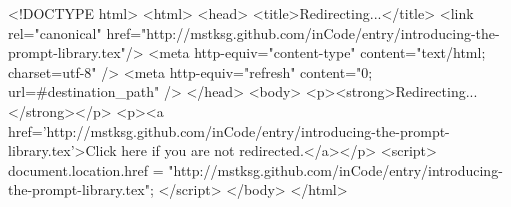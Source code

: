 <!DOCTYPE html>
<html>
<head>
<title>Redirecting...</title>
<link rel="canonical" href="http://mstksg.github.com/inCode/entry/introducing-the-prompt-library.tex"/>
<meta http-equiv="content-type" content="text/html; charset=utf-8" />
<meta http-equiv="refresh" content="0; url=#{destination_path}" />
</head>
<body>
  <p><strong>Redirecting...</strong></p>
  <p><a href='http://mstksg.github.com/inCode/entry/introducing-the-prompt-library.tex'>Click here if you are not redirected.</a></p>
  <script>
    document.location.href = "http://mstksg.github.com/inCode/entry/introducing-the-prompt-library.tex";
  </script>
</body>
</html>
